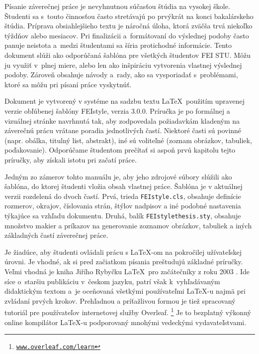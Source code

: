 Písanie záverečnej práce je nevyhnutnou súčasťou štúdia na vysokej škole.
Študenti sa s~touto činnosťou často stretávajú po prvýkrát na konci bakalárskeho štúdia.
Príprava obsiahlejšieho textu je náročná úloha,
ktorá zväčša trvá niekoľko týždňov alebo mesiacov.
Pri finalizácii a~formátovaní do výslednej podoby často panuje neistota a~medzi študentami sa šíria protichodné informácie.
Tento dokument slúži ako odporúčaná šablóna pre všetkých študentov FEI STU.
Môžu ju využiť v~plnej miere, alebo len ako inšpiráciu vytvorenia vlastnej výslednej podoby.
Zároveň obsahuje návody a~rady,
ako sa vysporiadať s~problémami,
ktoré sa môžu pri písaní práce vyskytnúť.

Dokument je vytvorený v systéme na sadzbu textu \LaTeX\ použitím upravenej verzie obľúbenej šablóny
FEIstyle, verzia 3.0.0. Príručka je po formálnej a vizuálnej stránke navrhnutá tak,
aby zodpovedala požiadavkám kladeným na záverečnú prácu vrátane poradia jednotlivých častí.
Niektoré časti sú povinné (napr. obálka, titulný list, abstrakt),
iné sú voliteľné (zoznam obrázkov, tabuliek, poďakovanie).
Odporúčame študentom prečítať si aspoň prvú kapitolu tejto príručky, aby získali istotu pri začatí práce.

Jedným zo zámerov tohto manuálu je,
aby jeho zdrojové súbory slúžili ako šablóna,
do ktorej študenti vložia obsah vlastnej práce.
Šablóna je v aktuálnej verzii rozdelená do dvoch častí.
Prvá, trieda \verb|FEIstyle.cls|, obsahuje definície rozmerov, okrajov,
číslovania strán, štýlov nadpisov a iné podobné nastavenia týkajúce sa vzhľadu
dokumentu.
Druhá, balík \verb|FEIstylethesis.sty|, obsahuje množstvo makier a príkazov na
generovanie zoznamov obrázkov, tabuliek a iných základných častí záverečnej práce.

Je žiadúce, aby študenti ovládali prácu s \LaTeX-om na pokročilej užívateľskej úrovni.
Je vhodné, ak si pred začiatkom písania preštudujú základné príručky. Veľmi vhodná je kniha
Jiřího Rybyčku \LaTeX\ pro začátečníky z roku 2003 \cite{Rybicka2003Latex}.
Ide síce o~staršiu publikáciu v~českom jazyku,
patrí však k~vyhľadávaným didaktickým textom
a~je oceňovaná všetkými používateľmi \LaTeX-u najmä pri zvládaní prvých krokov.
Prehľadnou a príťažlivou formou je tiež spracovaný tutoriál pre používateľov internetovej služby Overleaf.%
\footnote{\href{https://www.overleaf.com/learn}{\texttt{www.overleaf.com/learn}}}
Je to bezplatný výkonný online kompilátor \LaTeX-u podporovaný mnohými vedeckými vydavateľstvami.

